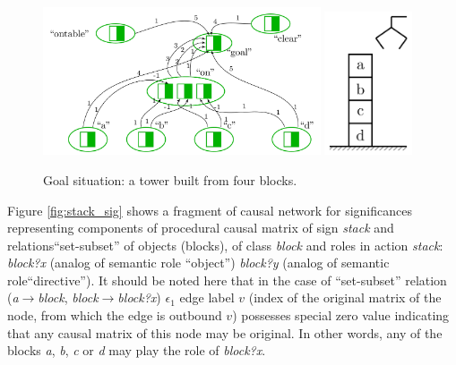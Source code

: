 \documentclass[review]{elsarticle}
\begin{document}
\begin{figure}
	\centering
	\includegraphics[width=0.73\textwidth]{plan_nets-0}
	\includegraphics[width=0.23\textwidth]{block_world-0}
	\caption{Goal situation: a tower built from four blocks.}	
	\label{fig:goal_sit}	
\end{figure}

Figure \ref{fig:stack_sig} shows a fragment of causal network for significances representing components of procedural causal matrix of sign \textit{stack} and relations``set-subset'' of objects (blocks), of class \textit{block} and roles in action \textit{stack}: \textit{block?x} (analog of semantic role ``object'') \textit{block?y} (analog of semantic role``directive''). It should be noted here that in the case of ``set-subset'' relation (\textit{a}$\rightarrow$\textit{block}, \textit{block}$\rightarrow$\textit{block?x}) $\epsilon_1$ edge label $v$ (index of the original matrix of the node, from which the edge is outbound $v$) possesses special zero value indicating that any causal matrix of this node may be original. In other words, any of the blocks \textit{a}, \textit{b}, \textit{c} or \textit{d} may play the role of \textit{block?x}.
\end{document}
